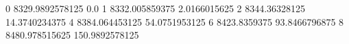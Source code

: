 0 8329.9892578125 0.0
1 8332.005859375 2.0166015625
2 8344.36328125 14.3740234375
4 8384.064453125 54.0751953125
6 8423.8359375 93.8466796875
8 8480.978515625 150.9892578125
